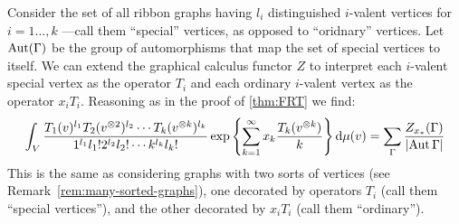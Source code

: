 Consider the set of all ribbon graphs having $l_i$ distinguished
$i$-valent vertices for $i=1\dots,k$ ---call them ``special''
vertices, as opposed to ``oridnary'' vertices. Let $\operatorname{Aut}(\Gamma)$ be the
group of automorphisms that map the set of special vertices to itself.
We can extend the graphical calculus functor $Z$ to interpret each
$i$-valent special vertex as the operator $T_i$ and each ordinary
$i$-valent vertex as the operator $x_iT_i$. Reasoning as in the proof
of \ref{thm:FRT} we find:
\begin{equation}
  \label{eq:FRT2}
  \int_V \frac{T_1(v)^{l_1} T_2(v\sp{\otimes 2})^{l_2} \cdots
    T_k(v\sp{\otimes k})^{l_k}} {1^{l_1} l_1! 2^{l_2} l_2! \cdots k^{l_k}
    l_k!} \exp \left\{ \sum_{k=1}^\infty x_k\frac{T_k(v\sp{\otimes k})}{k}
  \right\} \mathrm{d}\mu(v)
  = \sum_{\Gamma} \frac{Z_{x_*}(\Gamma)}{\lvert\operatorname{Aut}\Gamma\rvert}
\end{equation}
This is the same as considering graphs with two sorts of vertices (see
Remark~\ref{rem:many-sorted-graphs}), one decorated by operators $T_i$
(call them ``special vertices''), and the other decorated by $x_iT_i$
(call them ``ordinary'').


